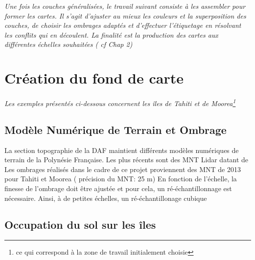 
\textit{Une fois les couches généralisées, le travail suivant consiste à les assembler pour former les cartes. Il s'agit d'ajuster au mieux les couleurs et la superposition des couches, de choisir les ombrages adaptés et d'effectuer l'étiquetage en résolvant les conflits qui en découlent. La finalité est la production des cartes aux différentes échelles souhaitées ( cf Chap 2)}

\section{Création du fond de carte}
\textit{Les exemples présentés ci-dessous concernent les îles de Tahiti et de Moorea\footnote{ce qui correspond à la zone de travail initialement choisie}}

\subsection{Modèle Numérique de Terrain et Ombrage}

La section topographie de la DAF maintient différents modèles numériques de terrain de la Polynésie Française. Les plus récents sont des MNT Lidar datant de %
Les ombrages réalisés dans le cadre de ce projet proviennent des MNT de 2013 pour Tahiti et Moorea ( précision du MNT: 25 m) En fonction de l'échelle, la finesse de l'ombrage doit être ajustée et pour cela, un ré-échantillonnage est nécessaire. Ainsi, à de petites échelles, un ré-échantillonage cubique 

\subsection{Occupation du sol sur les îles}

